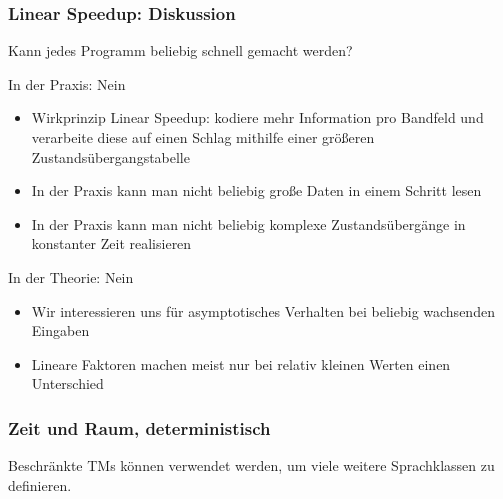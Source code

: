 \documentclass[onlymath]{beamer}
\begin{document}
\begin{frame}\frametitle{Linear Speedup: Diskussion}

\alert{Kann jedes Programm beliebig schnell gemacht werden?}\bigskip\pause

In der Praxis: Nein
\begin{itemize}
\item Wirkprinzip Linear Speedup: kodiere mehr Information pro Bandfeld und verarbeite
diese auf einen Schlag mithilfe einer größeren Zustandsübergangstabelle
\item In der Praxis kann man nicht beliebig große Daten in einem Schritt lesen
\item In der Praxis kann man nicht beliebig komplexe Zustandsübergänge in konstanter
Zeit realisieren
\end{itemize}
\bigskip\pause

In der Theorie: Nein
\begin{itemize}
\item Wir interessieren uns für asymptotisches Verhalten bei beliebig wachsenden
	Eingaben
\item Lineare Faktoren machen meist nur bei relativ kleinen Werten einen Unterschied
\end{itemize}

\end{frame}


\begin{frame}\frametitle{Zeit und Raum, deterministisch}

Beschränkte TMs können verwendet werden, um viele weitere Sprachklassen zu definieren.
\medskip

\pause

\pause



\end{frame}
\end{document}
